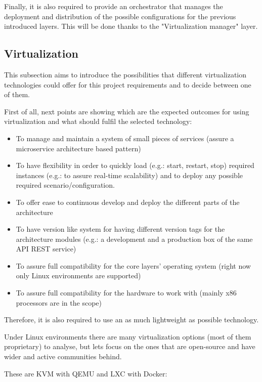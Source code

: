 Finally, it is also required to provide an orchestrator that manages the deployment and distribution of the possible configurations for the previous introduced layers. This will be done thanks to the "Virtualization manager" layer.

\subsection{Virtualization}

This subsection aims to introduce the possibilities that different virtualization technologies could offer for this project requirements and to decide between one of them.

First of all, next points are showing which are the expected outcomes for using virtualization and what should fulfil the selected technology:

\begin{itemize}
\item To manage and maintain a system of small pieces of services (assure a microservice architecture based pattern)
\item To have flexibility in order to quickly load (e.g.: start, restart, stop) required instances (e.g.: to assure real-time scalability) and to deploy any possible required scenario/configuration.
\item To offer ease to continuous develop and deploy the different parts of the architecture
\item To have version like system for having different version tags for the architecture modules (e.g.: a development and a production box of the same API REST service)
\item To assure full compatibility for the core layers' operating system (right now only Linux environments are supported)
\item To assure full compatibility for the hardware to work with (mainly x86 processors are in the scope)
\end{itemize}

Therefore, it is also required to use an as much lightweight as possible technology.

Under Linux environments there are many virtualization options (most of them proprietary) to analyse, but lets focus on the ones that are open-source and have wider and active communities behind.

These are KVM with QEMU and LXC with Docker:

